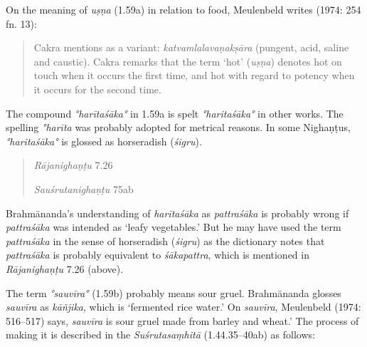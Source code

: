 \begin{ekdosis}
\begin{testimonia}[hp01_059]
\end{testimonia}

\begin{philcomm}[hp01_059]

On the meaning of \emph{uṣṇa} (1.59a) in relation to food,  Meulenbeld writes (1974: 254 fn. 13):
\begin{quote}
Cakra mentions as a variant: \emph{katvamlalavaṇakṣāra} (pungent, acid, saline and caustic). Cakra remarks that the term `hot' (\emph{uṣṇa}) denotes hot on touch when it occurs the first time, and hot with regard to potency when it occurs for the second time.
\end{quote}

The compound \emph{°harītaśāka°} in 1.59a is spelt \emph{°haritaśāka°} in other works. The spelling \emph{°harīta} was probably adopted for metrical reasons. In some Nighaṇṭus, \emph{°haritaśāka°} is glossed as horseradish (\emph{śigru}).
\begin{quote}
\emph{Rājanighaṇṭu} 7.26

\begin{versinnote}
\end{versinnote}
\emph{Sauśrutanighaṇṭu} 75ab
\begin{versinnote}
\end{versinnote}
\end{quote}

Brahmānanda’s understanding of \emph{harītaśāka} as \emph{pattraśāka} is probably wrong if \emph{pattraśāka} was intended as ‘leafy vegetables.’ But he may have used the term \emph{pattraśāka} in the sense of horseradish (\emph{śigru}) as the dictionary notes that \emph{pattraśāka} is probably equivalent to \emph{śākapattra}, which is mentioned in \emph{Rājanighaṇṭu} 7.26 (above).

The term \emph{°sauvīra°} (1.59b) probably means sour gruel. Brahmānanda glosses  \emph{sauvīra} as \emph{kāñjika}, which is `fermented rice water.' On \emph{sauvīra}, Meulenbeld (1974: 516–517) says, \emph{sauvīra} is sour gruel made from barley and wheat.' The process of making it is described in the \emph{Suśrutasaṃhitā} (1.44.35--40ab) as follows:


\end{philcomm}
\end{ekdosis}
